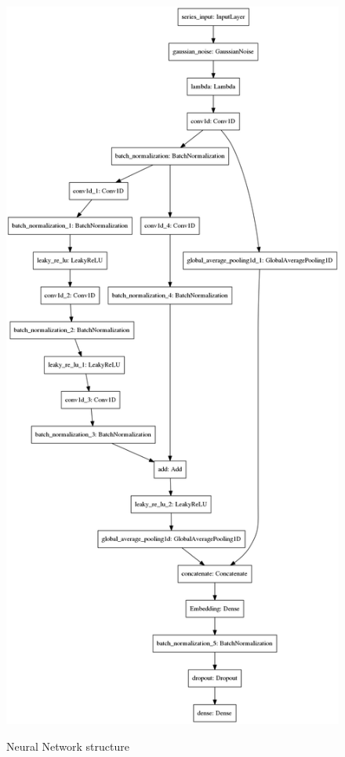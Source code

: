 \documentclass[a4paper,twoside]{article}
\begin{document}
\begin{figure}    
\begin{center}
  \label{fig:keras-nn}
  \includegraphics[height=0.95\textheight]{./figures/model_keras}
  \caption{Neural Network structure}
  \end{center}
\end{figure}
\end{document}
